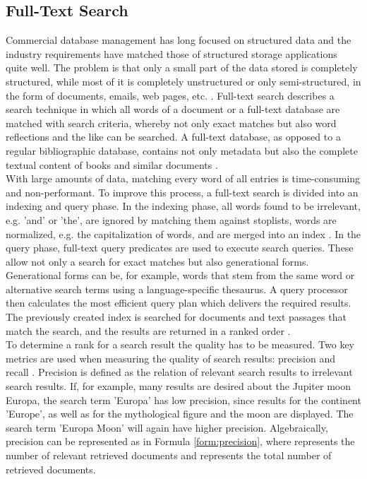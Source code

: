 \subsection{Full-Text Search}\label{sec:fulltext}
Commercial database management has long focused on structured data and the industry requirements have matched those of structured storage applications quite well.
The problem is that only a small part of the data stored is completely structured, while most of it is completely unstructured or only semi-structured, in the form of documents, emails, web pages, etc. \parencite[cf.][p. 7]{hamilton_microsoft_2001}. Full-text search describes a search technique in which all words of a document or a full-text database are matched with search criteria, whereby not only exact matches but also word reflections and the like can be searched. A full-text database, as opposed to a regular bibliographic database, contains not only metadata but also the complete textual content of books and similar documents \parencite[cf.][pp. 2-3]{tenopir_full_1990}.\\
With large amounts of data, matching every word of all entries is time-consuming and non-performant. To improve this process, a full-text search is divided into an indexing and query phase. In the indexing phase, all words found to be irrelevant, e.g. 'and' or 'the', are ignored by matching them against stoplists, words are normalized, e.g. the capitalization of words, and are merged into an index \parencite[cf.][p. 11]{coles_pro_2009}. In the query phase, full-text query predicates are used to execute search queries. These allow not only a search for exact matches but also generational forms. Generational forms can be, for example, words that stem from the same word or alternative search terms using a language-specific thesaurus. A query processor then calculates the most efficient query plan which delivers the required results. The previously created index is searched for documents and text passages that match the search, and the results are returned in a ranked order \parencite[cf.][pp. 11-12]{coles_pro_2009}.\\
To determine a rank for a search result the quality has to be measured. Two key metrics are used when measuring the quality of search results: precision \symp and recall \symr.
Precision is defined as the relation of relevant search results to irrelevant search results. If, for example, many results are desired about the Jupiter moon Europa, the search term 'Europa' has low precision, since results for the continent 'Europe', as well as for the mythological figure and the moon are displayed. The search term 'Europa Moon' will again have higher precision. Algebraically, precision can be represented as in Formula \ref{form:precision}, where \symn represents the number of relevant retrieved documents and \symd represents the total number of retrieved documents.
